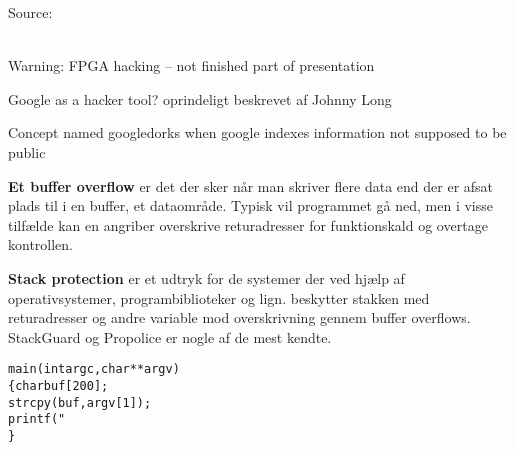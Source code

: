 \documentclass[20pt,landscape,a4paper,footrule]{foils}
\begin{document}
Source:\\
\\




Warning: FPGA hacking -- not finished part of presentation \smiley






\begin{list1}
\item Google as a hacker tool? oprindeligt beskrevet af Johnny Long
\item Concept named googledorks when google indexes information not supposed to be public
\end{list1}


\begin{list1}
\item {\bfseries Et buffer overflow}
er det der sker når man skriver flere data end der er afsat plads til
i en buffer, et dataområde. Typisk vil programmet gå ned, men i visse
tilfælde kan en angriber overskrive returadresser for funktionskald og
overtage kontrollen.
\item {\bfseries Stack protection}
er et udtryk for de systemer der ved hjælp af operativsystemer,
programbiblioteker og lign. beskytter stakken med returadresser og
andre variable mod overskrivning gennem buffer overflows. StackGuard
og Propolice er nogle af de mest kendte.
\end{list1}



\begin{alltt}
main(int argc, char **argv)
\{      char buf[200];
        strcpy(buf, argv[1]);
        printf("%s\textbackslash{}n",buf);
\}
\end{alltt}
\end{document}
